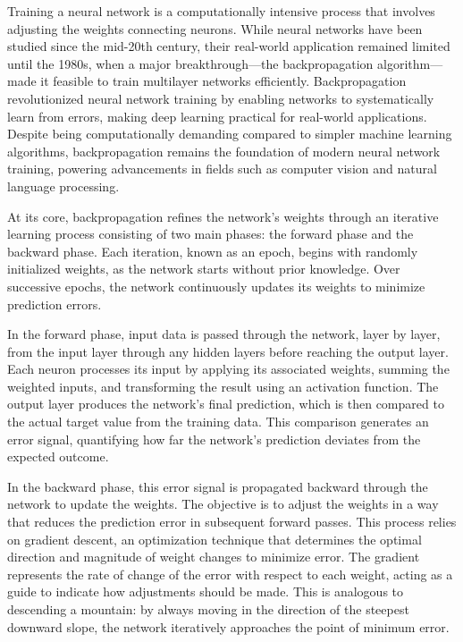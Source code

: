 \documentclass[
]{book}
\theoremstyle{definition}
\theoremstyle{definition}
\theoremstyle{definition}
\theoremstyle{definition}
\theoremstyle{remark}
\begin{document}
Training a neural network is a computationally intensive process that involves adjusting the weights connecting neurons. While neural networks have been studied since the mid-20th century, their real-world application remained limited until the 1980s, when a major breakthrough---the backpropagation algorithm---made it feasible to train multilayer networks efficiently. Backpropagation revolutionized neural network training by enabling networks to systematically learn from errors, making deep learning practical for real-world applications. Despite being computationally demanding compared to simpler machine learning algorithms, backpropagation remains the foundation of modern neural network training, powering advancements in fields such as computer vision and natural language processing.

At its core, backpropagation refines the network's weights through an iterative learning process consisting of two main phases: the forward phase and the backward phase. Each iteration, known as an epoch, begins with randomly initialized weights, as the network starts without prior knowledge. Over successive epochs, the network continuously updates its weights to minimize prediction errors.

In the forward phase, input data is passed through the network, layer by layer, from the input layer through any hidden layers before reaching the output layer. Each neuron processes its input by applying its associated weights, summing the weighted inputs, and transforming the result using an activation function. The output layer produces the network's final prediction, which is then compared to the actual target value from the training data. This comparison generates an error signal, quantifying how far the network's prediction deviates from the expected outcome.

In the backward phase, this error signal is propagated backward through the network to update the weights. The objective is to adjust the weights in a way that reduces the prediction error in subsequent forward passes. This process relies on gradient descent, an optimization technique that determines the optimal direction and magnitude of weight changes to minimize error. The gradient represents the rate of change of the error with respect to each weight, acting as a guide to indicate how adjustments should be made. This is analogous to descending a mountain: by always moving in the direction of the steepest downward slope, the network iteratively approaches the point of minimum error.
\end{document}
